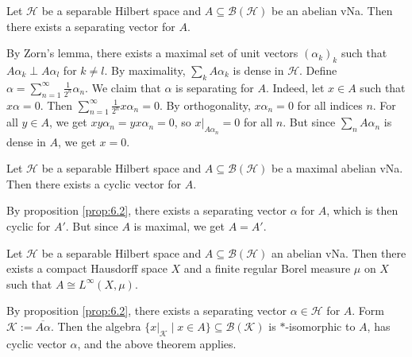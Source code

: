 \begin{proposition}\label{prop:6.2}
  Let $\mathcal{H}$ be a separable Hilbert space and $A \subseteq \mathcal{B}(\mathcal{H})$
  be an abelian vNa. Then there exists a separating vector for $A$.
\end{proposition}

\begin{myproof}
  By Zorn's lemma, there exists a maximal set of unit vectors $(\alpha_k)_k$ such that $A \alpha_k \perp A \alpha_l$
  for $k \neq l$. By maximality, $\sum_k A \alpha_k$ is dense in $\mathcal{H}$.
  Define $\alpha = \sum_{n = 1}^\infty \frac{1}{2^n} \alpha_n$. We claim that $\alpha$ is separating for $A$.
  Indeed, let $x \in A$ such that $x \alpha = 0$. Then $\sum_{n = 1}^\infty \frac{1}{2^n} x \alpha_n = 0$.
  By orthogonality, $x \alpha_n = 0$ for all indices $n$. For all $y \in A$, we get 
  $x y \alpha_n = y x \alpha_n = 0$, so $x\big|_{A \alpha_n} = 0$ for all $n$. But since $\sum_n A \alpha_n$ is dense in $A$, we get $x = 0$.
\end{myproof}

\begin{corollary}
  Let $\mathcal{H}$ be a separable Hilbert space and $A \subseteq \mathcal{B}(\mathcal{H})$
  be a maximal abelian vNa. Then there exists a cyclic vector for $A$.
\end{corollary}

\begin{myproof}
  By proposition \ref{prop:6.2}, there exists a separating vector $\alpha$ for $A$, which is then cyclic for 
  $A'$. But since $A$ is maximal, we get $A = A'$.
\end{myproof}

\begin{theorem}
  Let $\mathcal{H}$ be a separable Hilbert space and $A \subseteq \mathcal{B}(\mathcal{H})$ an abelian 
  vNa. Then there exists a compact Hausdorff space $X$ and a finite regular Borel measure $\mu$ on $X$ such that $A \cong L^\infty(X, \mu)$.
\end{theorem}

\begin{myproof}
  By proposition \ref{prop:6.2}, there exists a separating vector $\alpha \in \mathcal{H}$ for $A$. 
  Form $\mathcal{K} := \overline{A \alpha}$. Then the algebra $\{x\big|_{\mathcal{K}} \mid x \in A\} \subseteq \mathcal{B}(\mathcal{K})$
  is $*$-isomorphic to $A$, has cyclic vector $\alpha$, and the above theorem applies.
\end{myproof}

